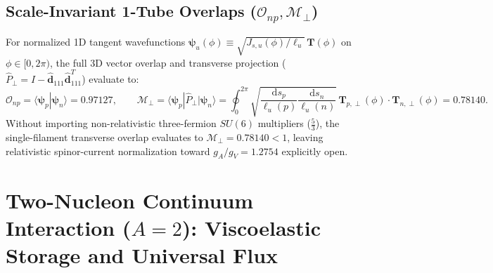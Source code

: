 \documentclass[11pt, a4paper]{article}
\DeclareRobustCommand{\dd}{\mathrm{d}}
\begin{document}
\subsection{\texorpdfstring{Scale-Invariant 1-Tube Overlaps ($\mathcal{O}_{np}, \mathcal{M}_\perp$)}{Scale-Invariant 1-Tube Overlaps}}
For normalized 1D tangent wavefunctions $\boldsymbol{\psi}_u(\phi) \equiv \sqrt{J_{s,u}(\phi)/\ell_u}\,\mathbf{T}(\phi)$ on $\phi \in [0, 2\pi)$, the full 3D vector overlap and transverse projection ($\hat{P}_\perp = I - \hat{\mathbf{d}}_{111}\hat{\mathbf{d}}_{111}^T$) evaluate to:
\begin{equation}
    \mathcal{O}_{np} = \langle\boldsymbol{\psi}_p|\boldsymbol{\psi}_n\rangle = \mathbf{0.97127}, \qquad
    \mathcal{M}_\perp = \langle\boldsymbol{\psi}_p|\hat{P}_\perp|\boldsymbol{\psi}_n\rangle = \oint_0^{2\pi} \sqrt{\frac{\dd s_p}{\ell_u(p)}\frac{\dd s_n}{\ell_u(n)}}\,\mathbf{T}_{p,\perp}(\phi)\cdot\mathbf{T}_{n,\perp}(\phi) = \mathbf{0.78140}.
    \label{eq:weak_single_integral}
\end{equation}
Without importing non-relativistic three-fermion $SU(6)$ multipliers ($\frac{5}{3}$), the single-filament transverse overlap evaluates to $\mathcal{M}_\perp = 0.78140 < 1$, leaving relativistic spinor-current normalization toward $g_A/g_V = 1.2754$ explicitly open.



\section{\texorpdfstring{Two-Nucleon Continuum Interaction ($A = 2$): Viscoelastic Storage and Universal Flux}{Two-Nucleon Continuum Interaction (A = 2): Viscoelastic Storage and Universal Flux}}
\label{sec:deuteron}
\end{document}
